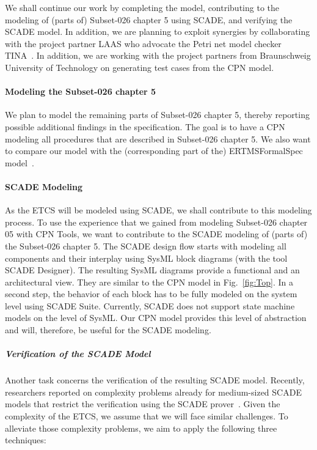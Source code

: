 We shall continue our work by completing the model, contributing to the modeling of (parts of) Subset-026 chapter 5 using SCADE, and verifying the SCADE model. In addition, we are planning to exploit synergies by collaborating with the project partner LAAS who advocate the Petri net model checker TINA~\cite{BerthomieuV2006}. In addition, we are working with the project partners from Braunschweig University of Technology on generating test cases from the CPN model.


\paragraph{Modeling the Subset-026 chapter 5}

We plan to model the remaining parts of Subset-026 chapter 5, thereby reporting possible additional findings in the specification. The goal is to have a CPN modeling all procedures that are described in Subset-026 chapter 5. We also want to compare our model with the (corresponding part of the) ERTMSFormalSpec model~\cite{ertms}.


\paragraph{SCADE Modeling}

As the ETCS will be modeled using SCADE, we shall contribute to this modeling process. To use the experience that we gained from modeling Subset-026 chapter 05 with CPN Tools, we want to contribute to the SCADE modeling of (parts of) the Subset-026 chapter 5. The SCADE design flow starts with modeling all components and their interplay using SysML block diagrams (with the tool SCADE Designer). The resulting SysML diagrams provide a functional and an architectural view. They are similar to the CPN model in Fig.~\ref{fig:Top}. In a second step, the behavior of each block has to be fully modeled on the system level using SCADE Suite. Currently, SCADE does not support state machine models on the level of SysML. Our CPN model provides this level of abstraction and will, therefore, be useful for the SCADE modeling.


\subparagraph{Verification of the SCADE Model}

Another task concerns the verification of the resulting SCADE model. Recently, researchers reported on complexity problems already for medium-sized SCADE models that restrict the verification using the SCADE prover~\cite{HuhnM2014scp,DaskayaHM2011fmics}. Given the complexity of the ETCS, we assume that we will face similar challenges. To alleviate those complexity problems, we aim to apply the following three techniques:

